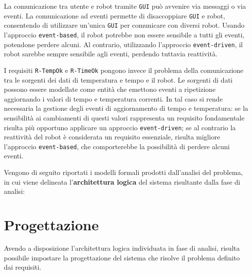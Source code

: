 \documentclass{llncs}
\newcommand{\action}[1]{\texttt{#1}\xspace}
\newcommand{\code}[1]{{\color{blue}\small{\texttt{#1}}}}
\newcommand{\labelsec}[1]{\label{sec:#1}}
\begin{document}
La comunicazione tra utente e robot tramite \action{GUI} può avvenire via messaggi o via eventi. La comunicazione ad eventi permette di disaccoppiare \action{GUI} e robot, consentendo di utilizzare un'unica \action{GUI} per comunicare con diversi robot. Usando l'approccio \code{event-based}, il robot potrebbe non essere sensibile a tutti gli eventi, potendone perdere alcuni. Al contrario, utilizzando l'approccio \code{event-driven}, il robot sarebbe sempre sensibile agli eventi, perdendo tuttavia reattività.

I requisiti \code{R-TempOk} e \code{R-TimeOk} pongono invece il problema della comunicazione tra le sorgenti dei dati di temperatura e tempo e il robot. Le sorgenti di dati possono essere modellate come entità che emettono eventi a ripetizione aggiornando i valori di tempo e temperatura correnti. In tal caso si rende necessaria la gestione degli eventi di aggiornamento di tempo e temperatura: se la sensibilità ai cambiamenti di questi valori rappresenta un requisito fondamentale risulta più opportuno applicare un approccio \code{event-driven}; se al contrario la reattività del robot è considerata un requisito essenziale, risulta migliore l'approccio \code{event-based}, che comporterebbe la possibilità di perdere alcuni eventi.

Vengono di seguito riportati i modelli formali prodotti dall'analisi del problema, in cui viene delineata l'\textbf{architettura logica} del sistema risultante dalla fase di analisi: 





\section{Progettazione}
\labelsec{Project}
Avendo a disposizione l'architettura logica individuata in fase di analisi, risulta possibile impostare la progettazione del sistema che risolve il problema definito dai requisiti.
\end{document}
